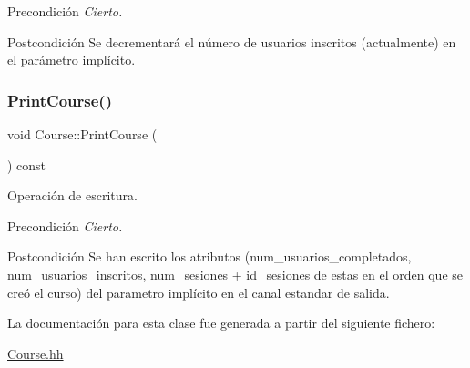 \begin{DoxyPrecond}{Precondición}
{\itshape Cierto.} 
\end{DoxyPrecond}
\begin{DoxyPostcond}{Postcondición}
Se decrementará el número de usuarios inscritos (actualmente) en el parámetro implícito. 
\end{DoxyPostcond}
\mbox{\label{class_course_ae6becc4684a1ae379b9e26b4b50d8d23}} 
\subsubsection{\texorpdfstring{Print\+Course()}{PrintCourse()}}
{\footnotesize\ttfamily void Course\+::\+Print\+Course (\begin{DoxyParamCaption}{ }\end{DoxyParamCaption}) const}



Operación de escritura. 

\begin{DoxyPrecond}{Precondición}
{\itshape Cierto.} 
\end{DoxyPrecond}
\begin{DoxyPostcond}{Postcondición}
Se han escrito los atributos (num\+\_\+usuarios\+\_\+completados, num\+\_\+usuarios\+\_\+inscritos, num\+\_\+sesiones + id\+\_\+sesiones de estas en el orden que se creó el curso) del parametro implícito en el canal estandar de salida. 
\end{DoxyPostcond}


La documentación para esta clase fue generada a partir del siguiente fichero\+:\begin{DoxyCompactItemize}
\item 
\mbox{\hyperlink{_course_8hh}{Course.\+hh}}\end{DoxyCompactItemize}
